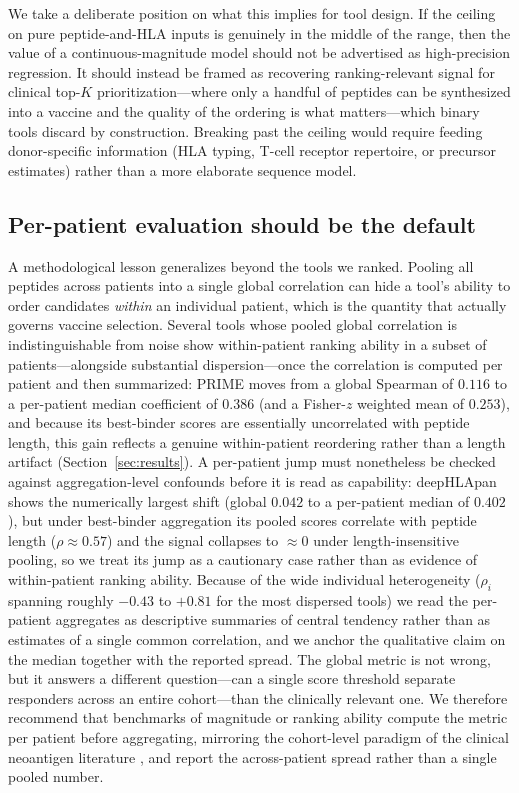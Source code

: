 We take a deliberate position on what this implies for tool design. If the
ceiling on pure peptide-and-HLA inputs is genuinely in the middle of the range,
then the value of a continuous-magnitude model should not be advertised as
high-precision regression. It should instead be framed as recovering
ranking-relevant signal for clinical top-$K$ prioritization---where only a handful
of peptides can be synthesized into a vaccine and the quality of the ordering is
what matters---which binary tools discard by construction. Breaking past the
ceiling would require feeding donor-specific information (HLA typing, T-cell
receptor repertoire, or precursor estimates) rather than a more elaborate
sequence model.

\subsection{Per-patient evaluation should be the default}
\label{sec:disc-perpatient}

A methodological lesson generalizes beyond the tools we ranked. Pooling all
peptides across patients into a single global correlation can hide a tool's
ability to order candidates \emph{within} an individual patient, which is the
quantity that actually governs vaccine selection. Several tools whose pooled
global correlation is indistinguishable from noise show within-patient ranking
ability in a subset of patients---alongside substantial dispersion---once the
correlation is computed per patient and then summarized: PRIME moves from a global
Spearman of $0.116$ to a per-patient median coefficient of $0.386$ (and a
Fisher-$z$ weighted mean of $0.253$), and because its best-binder scores are
essentially uncorrelated with peptide length, this gain reflects a genuine
within-patient reordering rather than a length artifact
(Section~\ref{sec:results}). A per-patient jump must nonetheless be checked against
aggregation-level confounds before it is read as capability: deepHLApan shows the
numerically largest shift (global $0.042$ to a per-patient median of $0.402$), but
under best-binder aggregation its pooled scores correlate with peptide length
($\rho \approx 0.57$) and the signal collapses to $\approx 0$ under
length-insensitive pooling, so we treat its jump as a cautionary case rather than
as evidence of within-patient ranking ability. Because of the wide individual
heterogeneity ($\rho_i$ spanning roughly $-0.43$ to $+0.81$ for the most dispersed
tools) we read the per-patient aggregates as descriptive summaries of central
tendency rather than as estimates of a single common correlation, and we anchor the
qualitative claim on the median together with the reported spread. The global metric is not wrong, but it answers a
different question---can a single score threshold separate responders across an
entire cohort---than the clinically relevant one. We therefore recommend that
benchmarks of magnitude or ranking ability compute the metric per patient before
aggregating, mirroring the cohort-level paradigm of the clinical neoantigen
literature \cite{TESLA2020,Muller2023}, and report the across-patient spread
rather than a single pooled number.

